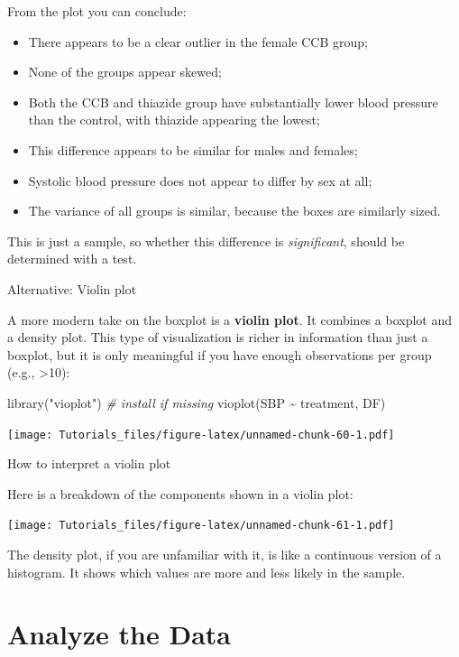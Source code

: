 \documentclass[
]{book}
\newenvironment{Shaded}{\begin{snugshade}}{\end{snugshade}}
\newcommand{\CommentTok}[1]{\textcolor[rgb]{0.56,0.35,0.01}{\textit{#1}}}
\newcommand{\FunctionTok}[1]{\textcolor[rgb]{0.00,0.00,0.00}{#1}}
\newcommand{\NormalTok}[1]{#1}
\newcommand{\SpecialCharTok}[1]{\textcolor[rgb]{0.00,0.00,0.00}{#1}}
\newcommand{\StringTok}[1]{\textcolor[rgb]{0.31,0.60,0.02}{#1}}
\providecommand{\tightlist}{%
  \setlength{\itemsep}{0pt}\setlength{\parskip}{0pt}}
\begin{document}
From the plot you can conclude:

\begin{itemize}
\tightlist
\item
  There appears to be a clear outlier in the female CCB group;
\item
  None of the groups appear skewed;
\item
  Both the CCB and thiazide group have substantially lower blood pressure than the control, with thiazide appearing the lowest;
\item
  This difference appears to be similar for males and females;
\item
  Systolic blood pressure does not appear to differ by sex at all;
\item
  The variance of all groups is similar, because the boxes are similarly sized.
\end{itemize}

This is just a sample, so whether this difference is \emph{significant}, should be determined with a test.

Alternative: Violin plot

A more modern take on the boxplot is a \textbf{violin plot}. It combines a boxplot and a density plot. This type of visualization is richer in information than just a boxplot, but it is only meaningful if you have enough observations per group (e.g., \textgreater10):

\begin{Shaded}
\begin{Highlighting}[]
\FunctionTok{library}\NormalTok{(}\StringTok{"vioplot"}\NormalTok{) }\CommentTok{\# install if missing}
\FunctionTok{vioplot}\NormalTok{(SBP }\SpecialCharTok{\textasciitilde{}}\NormalTok{ treatment, DF)}
\end{Highlighting}
\end{Shaded}

\texttt{[image: Tutorials\_files/figure-latex/unnamed-chunk-60-1.pdf]}

How to interpret a violin plot

Here is a breakdown of the components shown in a violin plot:

\texttt{[image: Tutorials\_files/figure-latex/unnamed-chunk-61-1.pdf]}

The density plot, if you are unfamiliar with it, is like a continuous version of a histogram. It shows which values are more and less likely in the sample.

\hypertarget{analyze-the-data}{%
\section{Analyze the Data}\label{analyze-the-data}}
\end{document}
